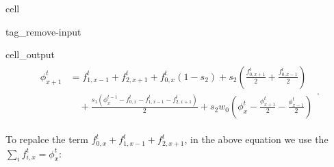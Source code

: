 \documentclass[letterpaper,10pt,english,openany,oneside]{jupyterBook}
\begin{document}
\begin{sphinxuseclass}{cell}
\begin{sphinxuseclass}{tag_remove-input}\begin{sphinxVerbatimOutput}

\begin{sphinxuseclass}{cell_output}\begin{equation*}
\begin{split}\displaystyle \begin{aligned}\phi_{x+1}^t &= f_{1,x-1}^{t} + f_{2,x+1}^{t} + f_{0,x}^{t} \left(1 - s_{2}\right) + s_{2} \left(\frac{f_{0,x+1}^{t}}{2} + \frac{f_{0,x-1}^{t}}{2}\right) \\ &\quad + \frac{s_{1} \left(\phi_{x}^{t-1} - f_{0,x}^{t} - f_{1,x-1}^{t} - f_{2,x+1}^{t}\right)}{2} + s_{2} w_{0} \left(\phi^{t}_{x} - \frac{\phi_{x+1}^t}{2} - \frac{\phi_{x-1}^t}{2}\right)\end{aligned}.\end{split}
\end{equation*}
\end{sphinxuseclass}\end{sphinxVerbatimOutput}

\end{sphinxuseclass}
\end{sphinxuseclass}
\sphinxAtStartPar
To repalce the term \(f_{0,x}^{t}+f_{1,x-1}^{t}+f_{2,x+1}^{t}\), in the above equation we use the \(\sum_{i}f_{i,x}^{t}=\phi_{x}^{t}\):
\end{document}
